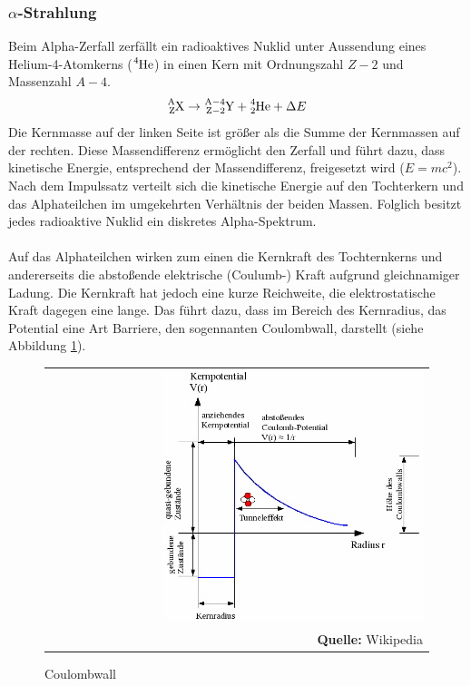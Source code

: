 \documentclass[a4paper,titlepage]{scrartcl}
\numberwithin{equation}{section}
\begin{document}
\subsubsection{$\alpha$-Strahlung}
Beim Alpha-Zerfall zerfällt ein radioaktives Nuklid unter Aussendung eines Helium-4-Atomkerns ($\ce{^{4}He}$) in einen Kern mit Ordnungszahl $Z-2$ und Massenzahl $A-4$.
\begin{equation*}
\ce{^{A}_{Z}X} \rightarrow \ce{^{A-4}_{Z-2}Y} + \ce{^{4}_{2}He} + \Delta E
\end{equation*}
Die Kernmasse auf der linken Seite ist größer als die Summe der Kernmassen auf der rechten. Diese Massendifferenz ermöglicht den Zerfall und führt dazu, dass kinetische Energie, entsprechend der Massendifferenz, freigesetzt wird ($E=mc^2$). Nach dem Impulssatz verteilt sich die kinetische Energie auf den Tochterkern und das Alphateilchen im umgekehrten Verhältnis der beiden Massen. Folglich besitzt jedes radioaktive Nuklid ein diskretes Alpha-Spektrum.\\ \\
Auf das Alphateilchen wirken zum einen die Kernkraft des Tochternkerns und andererseits die abstoßende elektrische (Coulumb-) Kraft aufgrund gleichnamiger Ladung. Die Kernkraft hat jedoch eine kurze Reichweite, die elektrostatische Kraft dagegen eine lange. Das führt dazu, dass im Bereich des Kernradius, das Potential eine Art Barriere, den sogennanten Coulombwall, darstellt (siehe Abbildung \ref{fig:coulombwall}).
\begin{figure}[H]
	\centering
	\begin{tabular}{@{}r@{}}
		\includegraphics[width=0.7\textwidth]{images/coulomb.png}\\
		\footnotesize\sffamily\textbf{Quelle:} Wikipedia \cite{wiki:alpha}
	\end{tabular}
	\caption{Coulombwall}
    \label{fig:coulombwall}
\end{figure}
\end{document}
